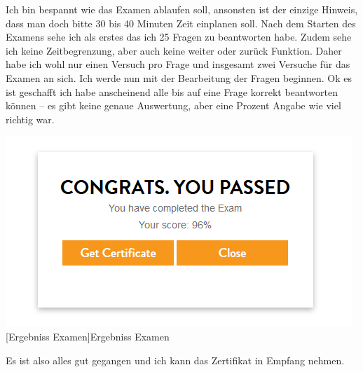 \documentclass[12pt,a4paper,bibliography=totocnumbered,listof=totocnumbered]{scrartcl}
\begin{document}
Ich bin bespannt wie das Examen ablaufen soll, ansonsten ist der einzige Hinweis, dass man doch bitte 30 bis 40 Minuten Zeit einplanen soll. 
Nach dem Starten des Examens sehe ich als erstes das ich 25 Fragen zu beantworten habe. Zudem sehe ich keine Zeitbegrenzung, aber auch keine weiter oder zurück Funktion. Daher habe ich wohl nur einen Versuch pro Frage und insgesamt zwei Versuche für das Examen an sich.  Ich werde nun mit der Bearbeitung der Fragen beginnen. 
\newline
Ok es ist geschafft ich habe anscheinend alle bis auf eine Frage korrekt beantworten können – es gibt keine genaue Auswertung, aber eine Prozent Angabe wie viel richtig war.  

\vspace{1em}
\begin{minipage}{\linewidth}
	\centering
	\includegraphics[width=1\linewidth]{Bilder/won.png}
	[Ergebniss Examen]{Ergebniss Examen \footnotemark }
	\label{fig:osgi}
\end{minipage}

\newpage
Es ist also alles gut gegangen und ich kann das Zertifikat in Empfang nehmen. 
\end{document}
